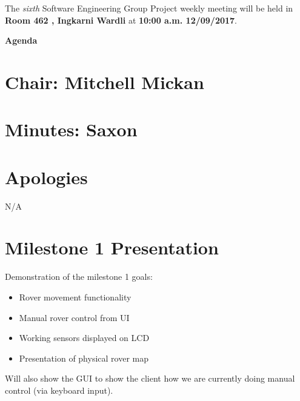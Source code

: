 \documentclass[11pt, a4paper]{article}
\newcommand{\meetingno}{ sixth }
\newcommand{\meetinglocation}{ Room 462 , Ingkarni Wardli } %
\newcommand{\meetingdatetime}{ 10:00 a.m. 12/09/2017} %
\newcommand{\meetingchair}{ Mitchell Mickan } %
\newcommand{\meetingminutes}{ Saxon }
\begin{document}
  \noindent The {\em \meetingno} Software Engineering Group Project weekly meeting will be held in {\bf \meetinglocation } at {\bf \meetingdatetime }.

  \vspace*{15pt}

  \begin{center}
  \huge \bf Agenda
  \end{center}

  \section*{Chair: \meetingchair }
  \section*{Minutes: \meetingminutes }
  

  \vspace*{10pt}

  \section{Apologies}
  N/A %

  \section{Milestone 1 Presentation}
  Demonstration of the milestone 1 goals:
  \begin{itemize}
	\item{Rover movement functionality}
	\item{Manual rover control from UI}
	\item{Working sensors displayed on LCD}
	\item{Presentation of physical rover map}
  \end{itemize}
  Will also show the GUI to show the client how we are currently doing manual control (via keyboard input).

\end{document}
